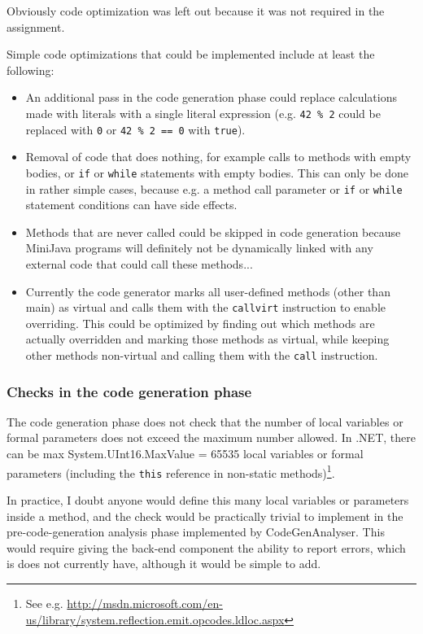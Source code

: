 \documentclass[a4paper,11pt]{article}
\begin{document}
Obviously code optimization was left out because it was not required in the assignment.

Simple code optimizations that could be implemented include at least the following:
\begin{itemize}
    \item An additional pass in the code generation phase could replace calculations made with literals with a single literal expression (e.g. \verb,42 % 2, could be replaced with \verb,0, or \verb,42 % 2 == 0, with \verb,true,).
    \item Removal of code that does nothing, for example calls to methods with empty bodies, or \verb,if, or \verb,while, statements with empty bodies. This can only be done in rather simple cases, because e.g. a method call parameter or \verb,if, or \verb,while, statement conditions can have side effects.
    \item Methods that are never called could be skipped in code generation because MiniJava programs will definitely not be dynamically linked with any external code that could call these methods...
    \item Currently the code generator marks all user-defined methods (other than main) as virtual and calls them with the \verb,callvirt, instruction to enable overriding. This could be optimized by finding out which methods are actually overridden and marking those methods as virtual, while keeping other methods non-virtual and calling them with the \verb,call, instruction.
\end{itemize}

\subsubsection{Checks in the code generation phase}

The code generation phase does not check that the number of local variables or formal parameters does not exceed the maximum number allowed. In .NET, there can be max System.UInt16.MaxValue = 65535 local variables or formal parameters (including the \verb,this, reference in non-static methods)\footnote{See e.g. \url{http://msdn.microsoft.com/en-us/library/system.reflection.emit.opcodes.ldloc.aspx}}.

In practice, I doubt anyone would define this many local variables or parameters inside a method, and the check would be practically trivial to implement in the pre-code-generation analysis phase implemented by CodeGenAnalyser. This would require giving the back-end component the ability to report errors, which is does not currently have, although it would be simple to add.
\end{document}
